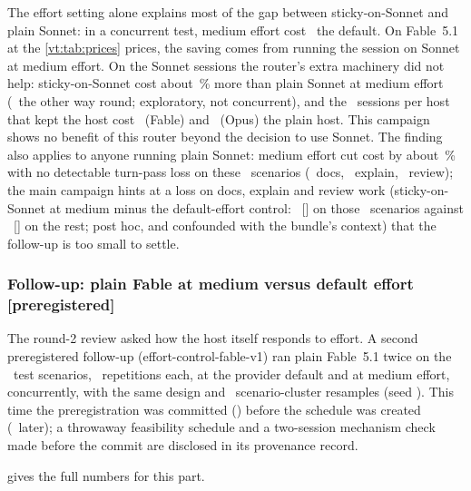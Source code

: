 \begin{keyidea}
The effort setting alone explains most of the gap between sticky-on-Sonnet and plain Sonnet: in a concurrent test,
medium effort cost \EcRatio\X\ the default. On Fable~5.1 at the \cref{vt:tab:prices} prices, the saving comes from
running the session on Sonnet at medium effort. On the Sonnet sessions the router's extra machinery did not help: sticky-on-Sonnet cost about \EcSecGapPct\,\% more
than plain Sonnet at medium effort (\EcSecRatio\ the other way round; exploratory, not concurrent), and the
\RvStickyHostNFable\ sessions per host that kept the host cost \RvStickyHostFableTwo\X\ (Fable) and
\RvStickyHostOpusTwo\X\ (Opus) the plain host. This campaign shows no benefit of this router beyond the decision to use
Sonnet. The finding also applies to anyone running plain Sonnet:
medium effort cut cost by about \EcCutPct\,\% with no detectable turn-pass loss on these \EcScen\ scenarios (\RvDocsTest\ docs, \RvExplainTest\ explain, \RvReviewTest\ review); the main campaign
hints at a loss on docs, explain and review work (sticky-on-Sonnet at medium minus the default-effort control:
\RvKTDtp\ [\RvKTDtpCI] on those \RvKTN\ scenarios against \RvRestDtp\ [\RvRestDtpCI] on the rest; post hoc, and
confounded with the bundle's context) that the follow-up is too small to settle.
\end{keyidea}

\subsubsection{Follow-up: plain Fable at medium versus default effort \texorpdfstring{[preregistered]}{[preregistered]}}\label{vt:sec:effortfable}

The round-2 review asked how the host itself responds to effort. A second preregistered follow-up
(effort-control-fable-v1) ran plain Fable~5.1 twice on the \EcScen\ test scenarios, \EcReps\ repetitions each, at the
provider default and at medium effort, concurrently, with the same design and \EcResamples\ scenario-cluster resamples
(seed \EcSeed). This time the preregistration was committed (\code{\EfPreregSha}) before the schedule was created
(\EfScheduleAfter\ later); a throwaway feasibility schedule and a two-session mechanism check made before the commit
are disclosed in its provenance record.

 gives the full numbers for this part.

\begin{table}[tbp]
\centering\small
\caption{Fable effort follow-up (evidence package in \cref{tab:evidence}). Cost rows are
geometric-mean ratios of tools-normalized session cost; below 1 means the first arm is cheaper.}
\label{vt:tab:effortfable}
{\footnotesize\setlength{\tabcolsep}{2pt}}
\end{table}

